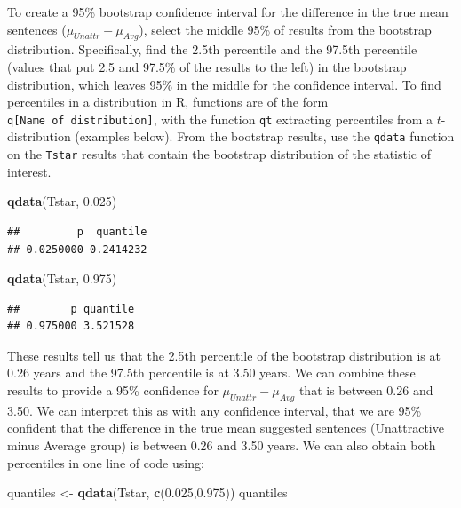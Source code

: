 \documentclass[]{book}
\newenvironment{Shaded}{\begin{snugshade}}{\end{snugshade}}
\newcommand{\KeywordTok}[1]{\textcolor[rgb]{0.13,0.29,0.53}{\textbf{{#1}}}}
\newcommand{\FloatTok}[1]{\textcolor[rgb]{0.00,0.00,0.81}{{#1}}}
\newcommand{\StringTok}[1]{\textcolor[rgb]{0.31,0.60,0.02}{{#1}}}
\newcommand{\NormalTok}[1]{{#1}}
\begin{document}
To create a 95\% bootstrap confidence interval for the difference in the
true mean sentences (\(\mu_{Unattr}-\mu_{Avg}\)), select the middle 95\%
of results from the bootstrap distribution. Specifically, find the 2.5th
percentile and the 97.5th percentile (values that put 2.5 and 97.5\% of
the results to the left) in the bootstrap distribution, which leaves
95\% in the middle for the confidence interval. To find percentiles in a
distribution in R, functions are of the form
\texttt{q{[}Name\ of\ distribution{]}}, with the function \texttt{qt}
extracting percentiles from a \(t\)-distribution (examples below). From
the bootstrap results, use the \texttt{qdata} function on the
\texttt{Tstar} results that contain the bootstrap distribution of the
statistic of interest.

\begin{Shaded}
\begin{Highlighting}[]
\KeywordTok{qdata}\NormalTok{(Tstar, }\FloatTok{0.025}\NormalTok{)}
\end{Highlighting}
\end{Shaded}

\begin{verbatim}
##         p  quantile 
## 0.0250000 0.2414232
\end{verbatim}

\begin{Shaded}
\begin{Highlighting}[]
\KeywordTok{qdata}\NormalTok{(Tstar, }\FloatTok{0.975}\NormalTok{)}
\end{Highlighting}
\end{Shaded}

\begin{verbatim}
##        p quantile 
## 0.975000 3.521528
\end{verbatim}

These results tell us that the 2.5th percentile of the bootstrap
distribution is at 0.26 years and the 97.5th percentile is at 3.50
years. We can combine these results to provide a 95\% confidence for
\(\mu_{Unattr}-\mu_{Avg}\) that is between 0.26 and 3.50. We can
interpret this as with any confidence interval, that we are 95\%
confident that the difference in the true mean suggested sentences
(Unattractive minus Average group) is between 0.26 and 3.50 years. We
can also obtain both percentiles in one line of code using:

\begin{Shaded}
\begin{Highlighting}[]
\NormalTok{quantiles <-}\StringTok{ }\KeywordTok{qdata}\NormalTok{(Tstar, }\KeywordTok{c}\NormalTok{(}\FloatTok{0.025}\NormalTok{,}\FloatTok{0.975}\NormalTok{))}
\NormalTok{quantiles}
\end{Highlighting}
\end{Shaded}
\end{document}

